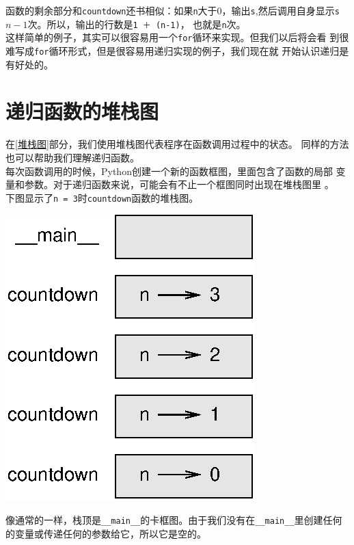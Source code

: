 {函数的剩余部分和{\tt countdown}还书相似：如果{\tt n}大于0，输出{\tt s},然后调用自身显示{\tt s} $n-1$次。所以，输出的行数是{\tt 1 ＋ (n-1)}，
也就是{\tt n}次。\\

这样简单的例子，其实可以很容易用一个{\tt for}循环来实现。但我们以后将会看
到很难写成{\tt for}循环形式，但是很容易用递归实现的例子，我们现在就
开始认识递归是有好处的。

{\section{递归函数的堆栈图}
 
在\ref{堆栈图}部分，我们使用堆栈图代表程序在函数调用过程中的状态。
同样的方法也可以帮助我们理解递归函数。\\

每次函数调用的时候，Python创建一个新的函数框图，里面包含了函数的局部
变量和参数。对于递归函数来说，可能会有不止一个框图同时出现在堆栈图里
。\\

下图显示了{\tt n = 3}时{\tt countdown}函数的堆栈图。

\beforefig
\centerline{\includegraphics{figs/stack2.eps}}
\afterfig

像通常的一样，栈顶是\verb"__main__"的卡框图。由于我们没有在\verb"__main__"里创建任何的变量或传递任何的参数给它，所以它是空的。


}}
